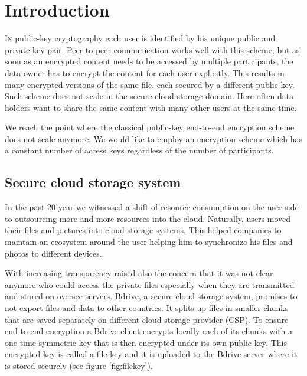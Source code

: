 \section{Introduction}
\label{sec:introduction}
\lettrine[nindent=0em,lines=3]{I}n public-key cryptography each user is identified by his unique public and private key pair. Peer-to-peer communication works well with this scheme, but as soon as an encrypted content needs to be accessed by multiple participants, the data owner has to encrypt the content for each user explicitly. This results in many encrypted versions of the same  file, each secured by a different public key. Such scheme does not scale in the secure cloud storage domain. Here often data holders want to share the same content with many other users at the same time.

We reach the point where the classical public-key end-to-end encryption scheme does not scale anymore. We would like to employ an encryption scheme which has a constant number of access keys regardless of the number of participants.

\subsection{Secure cloud storage system}
In the past 20 year we witnessed a shift of resource consumption on the user side to outsourcing more and more resources into the cloud. Naturally, users moved their files and pictures into cloud storage systems. This helped companies to maintain an ecosystem around the user helping him to synchronize his files and photos to different devices.  

With increasing transparency raised also the concern that it was not clear anymore who could access the private files especially when they are transmitted and stored on oversee servers. Bdrive, a secure cloud storage system, promises to not export files and data to other countries. It splits up files in smaller chunks that are saved separately on different cloud storage provider (\ac{CSP}). To ensure end-to-end encryption a Bdrive client encrypts locally each of its chunks with a one-time symmetric key that is then encrypted under its own public key. This encrypted key is called a file key and it is uploaded to the Bdrive server where it is stored securely (see figure \ref{fig:filekey}).

